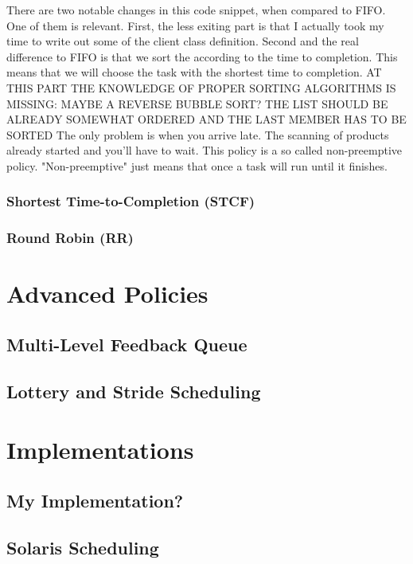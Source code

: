 \documentclass{report}
\newcounter{defi}[section]\setcounter{defi}{0}
\begin{document}
There are two notable changes in this code snippet, when compared to FIFO. One of them is relevant.
First, the less exiting part is that I actually took my time to write out some of the client class definition.
Second and the real difference to FIFO is that we sort the according to the time to completion. 
This means that we will choose the task with the shortest time to completion.
AT THIS PART THE KNOWLEDGE OF PROPER SORTING ALGORITHMS IS MISSING: MAYBE A REVERSE BUBBLE SORT? 
THE LIST SHOULD BE ALREADY SOMEWHAT ORDERED AND THE LAST MEMBER HAS TO BE SORTED
The only problem is when you arrive late. The scanning of products already started and you'll have to wait.
This policy is a so called non-preemptive policy.
"Non-preemptive" just means that once a task will run until it finishes.


\section{Shortest Time-to-Completion (STCF)}

\section{Round Robin (RR)}





\part{Advanced Policies}

\chapter{Multi-Level Feedback Queue}

\chapter{Lottery and Stride Scheduling}

\part{Implementations}

\chapter{My Implementation?}

\chapter{Solaris Scheduling}
\end{document}
